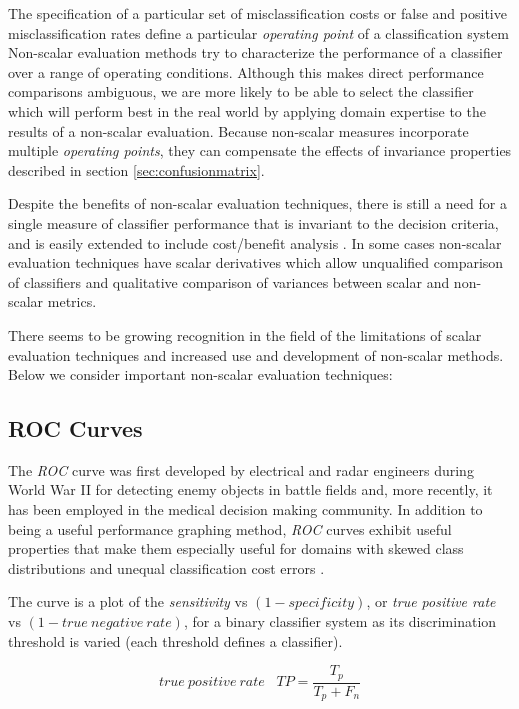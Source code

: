 \documentclass[10pt]{unbthesis}
\begin{document}
The specification of a particular set of
misclassification costs or false and positive misclassification rates
define a particular \textit{operating point} of a classification system
Non-scalar evaluation methods try to characterize the performance of a
classifier over a range of operating conditions. Although this makes
direct performance comparisons ambiguous, we are more likely to be
able to select the classifier which will perform best in the real
world by applying domain expertise to the results of a non-scalar
evaluation. Because non-scalar measures incorporate multiple
\textit{operating points}, they can compensate the effects of
invariance properties described in section \ref{sec:confusionmatrix}.

Despite the benefits of non-scalar
evaluation techniques, there is still a need for a single measure of
classifier performance that is invariant to the decision criteria, and
is easily extended to include cost/benefit analysis
\cite{RefWorks:32}. In some cases non-scalar evaluation techniques
have scalar derivatives which allow unqualified comparison of
classifiers and qualitative comparison of variances between scalar and
non-scalar metrics.

There seems to be growing recognition in the field of the limitations
of scalar evaluation techniques and increased use and development of
non-scalar methods. Below we consider important non-scalar evaluation
techniques:

\subsection{ROC Curves}
The \textit{ROC} curve was first developed by electrical and radar
engineers during World War II for detecting enemy objects in battle
fields and, more recently, it has been employed in the medical decision
making community. In addition to being a useful performance graphing
method, \textit{ROC} curves exhibit useful properties that make them
especially useful for domains with skewed class distributions and
unequal classification cost errors \cite{RefWorks:39}. 

The curve is a plot of the \textit{sensitivity}  vs \((1-
specificity)\), or \textit{true positive rate} vs \((1 -
true\:negative\:rate)\), for a binary classifier system as its discrimination
threshold is varied (each threshold defines a classifier).

\begin{equation}
\label{equ:truepositiverate}
true\:positive\:rate\;\;\;TP = \frac{T_p}{T_p + F_n}
\end{equation}
\end{document}
